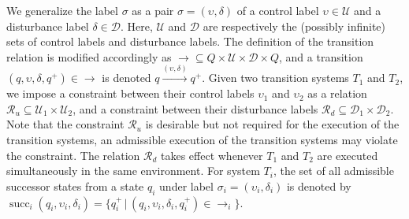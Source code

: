 We generalize the label $\sigma$ %
as a pair $\sigma = (\upsilon, \delta)$ of a control label $\upsilon \in \mathcal{U}$ and a disturbance label $\delta \in \mathcal{D}$.
Here, $\mathcal{U}$ and $\mathcal{D}$ are respectively the (possibly infinite) sets of control labels and disturbance labels.
The definition of the transition relation is modified accordingly as $\rightarrow \subseteq Q \times \mathcal{U} \times \mathcal{D} \times Q$, and a transition $(q, \upsilon, \delta, q^{+}) \in \rightarrow$ is denoted $q \xrightarrow{(\upsilon, \delta)} q^{+}$.
Given two transition systems $T_{1}$ and $T_{2}$, we impose a constraint between their control labels $\upsilon_{1}$ and $\upsilon_2$ as a relation $\mathcal{R}_u \subseteq \mathcal{U}_1 \times \mathcal{U}_2$, and a constraint between their disturbance labels $\mathcal{R}_{d}\subseteq \mathcal{D}_1 \times \mathcal{D}_2$.
Note that the constraint $\mathcal{R}_{u}$ is desirable but not required for the execution of the transition systems, \ie an admissible execution of the transition systems may violate the constraint.
The relation $\mathcal{R}_{d}$ takes effect whenever $T_{1}$ and $T_{2}$ are executed simultaneously in the same environment.
For system $T_{i}$, the set of all admissible successor states from a state $q_{i}$ under label $\sigma_{i} = (\upsilon_{i}, \delta_{i})$ is denoted by $\operatorname{succ}_{i}(q_{i}, \upsilon_{i}, \delta_{i}) = \{q_{i}^{+} \,|\, (q_{i}, \upsilon_{i}, \delta_{i}, q_{i}^{+}) \in \rightarrow_{i}\}$.

